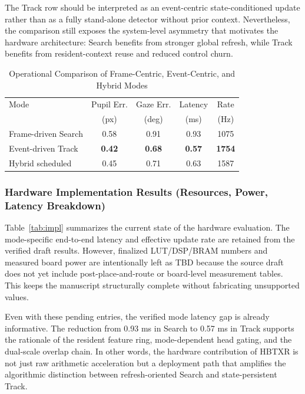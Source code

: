 \documentclass[journal]{IEEEtran}
\begin{document}
The Track row should be interpreted as an event-centric state-conditioned update rather than as a fully stand-alone detector without prior context. Nevertheless, the comparison still exposes the system-level asymmetry that motivates the hardware architecture: Search benefits from stronger global refresh, while Track benefits from resident-context reuse and reduced control churn.

\begin{table}[t]
\caption{Operational Comparison of Frame-Centric, Event-Centric, and Hybrid Modes}
\label{tab:mode}
\centering
\footnotesize
\begin{tabular}{p{}c c c c}
\toprule
Mode & Pupil Err. & Gaze Err. & Latency & Rate \\
 & (px) & (deg) & (ms) & (Hz) \\
\midrule
Frame-driven Search & 0.58 & 0.91 & 0.93 & 1075 \\
Event-driven Track & \textbf{0.42} & \textbf{0.68} & \textbf{0.57} & \textbf{1754} \\
Hybrid scheduled & 0.45 & 0.71 & 0.63 & 1587 \\
\bottomrule
\end{tabular}
\end{table}

\subsubsection{Hardware Implementation Results (Resources, Power, Latency Breakdown)}
Table~\ref{tab:impl} summarizes the current state of the hardware evaluation. The mode-specific end-to-end latency and effective update rate are retained from the verified draft results. However, finalized LUT/DSP/BRAM numbers and measured board power are intentionally left as TBD because the source draft does not yet include post-place-and-route or board-level measurement tables. This keeps the manuscript structurally complete without fabricating unsupported values.

Even with these pending entries, the verified mode latency gap is already informative. The reduction from 0.93 ms in Search to 0.57 ms in Track supports the rationale of the resident feature ring, mode-dependent head gating, and the dual-scale overlap chain. In other words, the hardware contribution of HBTXR is not just raw arithmetic acceleration but a deployment path that amplifies the algorithmic distinction between refresh-oriented Search and state-persistent Track.
\end{document}
